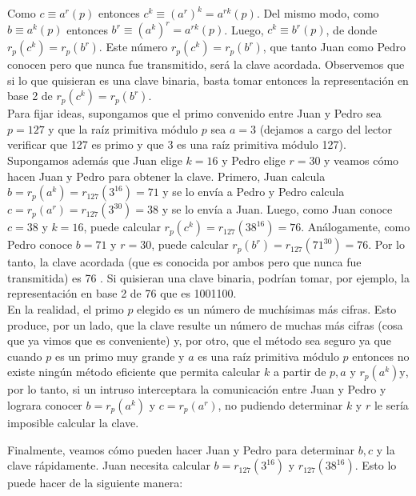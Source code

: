 \documentclass[10pt]{article}
\begin{document}
Como $c \equiv a^{r}(p)$ entonces $c^{k} \equiv\left(a^{r}\right)^{k}=a^{r k}(p)$. Del mismo modo, como $b \equiv a^{k}(p)$ entonces $b^{r} \equiv\left(a^{k}\right)^{r}=a^{r k}(p)$. Luego, $c^{k} \equiv b^{r}(p)$, de donde $r_{p}\left(c^{k}\right)=r_{p}\left(b^{r}\right)$. Este número $r_{p}\left(c^{k}\right)=r_{p}\left(b^{r}\right)$, que tanto Juan como Pedro conocen pero que nunca fue transmitido, será la clave acordada. Observemos que si lo que quisieran es una clave binaria, basta tomar entonces la representación en base 2 de $r_{p}\left(c^{k}\right)=r_{p}\left(b^{r}\right)$.\\
Para fijar ideas, supongamos que el primo convenido entre Juan y Pedro sea $p=127$ y que la raíz primitiva módulo $p$ sea $a=3$ (dejamos a cargo del lector verificar que 127 es primo y que 3 es una raíz primitiva módulo 127). Supongamos además que Juan elige $k=16$ y Pedro elige $r=30$ y veamos cómo hacen Juan y Pedro para obtener la clave. Primero, Juan calcula $b=r_{p}\left(a^{k}\right)=r_{127}\left(3^{16}\right)=71$ y se lo envía a Pedro y Pedro calcula $c=r_{p}\left(a^{r}\right)=r_{127}\left(3^{30}\right)=38$ y se lo envía a Juan. Luego, como Juan conoce $c=38$ y $k=16$, puede calcular $r_{p}\left(c^{k}\right)=r_{127}\left(38^{16}\right)=76$. Análogamente, como Pedro conoce $b=71$ y $r=30$, puede calcular $r_{p}\left(b^{r}\right)=r_{127}\left(71^{30}\right)=76$. Por lo tanto, la clave acordada (que es conocida por ambos pero que nunca fue transmitida) es 76 . Si quisieran una clave binaria, podrían tomar, por ejemplo, la representación en base 2 de 76 que es 1001100.\\
En la realidad, el primo $p$ elegido es un número de muchísimas más cifras. Esto produce, por un lado, que la clave resulte un número de muchas más cifras (cosa que ya vimos que es conveniente) y, por otro, que el método sea seguro ya que cuando $p$ es un primo muy grande y $a$ es una raíz primitiva módulo $p$ entonces no existe ningún método eficiente que permita calcular $k$ a partir de $p, a$ y $r_{p}\left(a^{k}\right) \mathrm{y}$, por lo tanto, si un intruso interceptara la comunicación entre Juan y Pedro y lograra conocer $b=r_{p}\left(a^{k}\right)$ y $c=r_{p}\left(a^{r}\right)$, no pudiendo determinar $k$ y $r$ le sería imposible calcular la clave.

Finalmente, veamos cómo pueden hacer Juan y Pedro para determinar $b, c$ y la clave rápidamente. Juan necesita calcular $b=r_{127}\left(3^{16}\right)$ y $r_{127}\left(38^{16}\right)$. Esto lo puede hacer de la siguiente manera:
\end{document}

